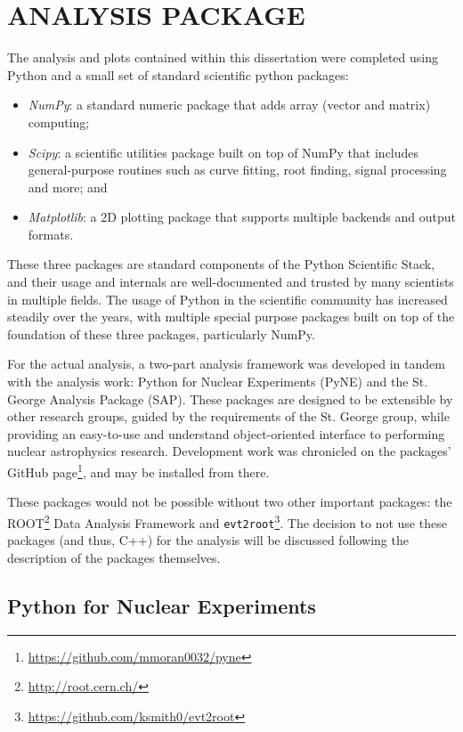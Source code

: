 \chapter{ANALYSIS PACKAGE}

The analysis and plots contained within this dissertation were completed
using Python and a small set of standard scientific python packages:

\begin{itemize}
\item
    \emph{NumPy}: a standard numeric package that adds array (vector and
    matrix) computing;
\item
    \emph{Scipy}: a scientific utilities package built on top of NumPy
    that includes general-purpose routines such as curve fitting, root
    finding, signal processing and more; and
\item
    \emph{Matplotlib}: a 2D plotting package that supports multiple
    backends and output formats.
\end{itemize}

These three packages are standard components of the Python Scientific
Stack, and their usage and internals are well-documented and trusted by
many scientists in multiple fields. The usage of Python in the
scientific community has increased steadily over the years, with
multiple special purpose packages built on top of the foundation of
these three packages, particularly NumPy.

For the actual analysis, a two-part analysis framework was developed in
tandem with the analysis work: Python for Nuclear Experiments (PyNE) and
the St. George Analysis Package (SAP). These packages are designed to be
extensible by other research groups, guided by the requirements of the
St. George group, while providing an easy-to-use and understand
object-oriented interface to performing nuclear astrophysics research.
Development work was chronicled on the packages' GitHub
page\footnote{\url{https://github.com/mmoran0032/pyne}}, and may be
installed from there.

These packages would not be possible without two other important
packages: the ROOT\footnote{\url{http://root.cern.ch/}}
Data Analysis Framework\cite{ROOT} and
\texttt{evt2root}\footnote{\url{https://github.com/ksmith0/evt2root}}.
The
decision to not use these packages (and thus, C++) for the analysis will
be discussed following the description of the packages themselves.

\section{Python for Nuclear Experiments}


